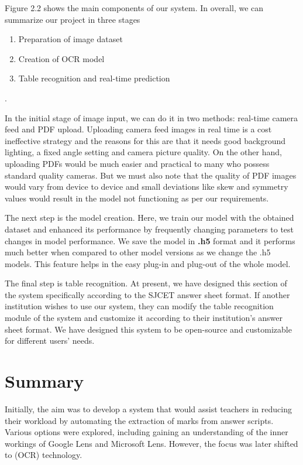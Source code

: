 \noindent
Figure 2.2 shows the main components of our system. In overall, we can summarize our project in three stages \begin{enumerate}
        \item Preparation of image dataset 
        \item Creation of OCR model 
        \item Table recognition and real-time prediction
    \end{enumerate}. 

\vspace{2.5mm}

\noindent
In the initial stage of image input, we can do it in two methods: real-time camera feed and PDF upload. Uploading camera feed images in real time is a cost ineffective strategy and the reasons for this are that it needs good background lighting, a fixed angle setting and camera picture quality. On the other hand, uploading PDFs would be much easier and practical to many who possess standard quality cameras. But we must also note that the quality of PDF images would vary from device to device and small deviations like skew and symmetry values would result in the model not functioning as per our requirements.

\noindent
The next step is the model creation. Here, we train our model with the obtained dataset and enhanced its performance by frequently changing parameters to test changes in model performance. We save the model in \textbf{.h5} format and it performs much better when compared to other model versions as we change the .h5 models. This feature helps in the easy plug-in and plug-out of the whole model.

\clearpage

\noindent
The final step is table recognition. At present, we have designed this section of the system specifically according to the SJCET answer sheet format. If another institution wishes to use our system, they can modify the table recognition module of the system and customize it according to their institution's answer sheet format. We have designed this system to be open-source and customizable for different users' needs.

\section{Summary}

\noindent 
Initially, the aim was to develop a system that would assist teachers in reducing their workload by automating the extraction of marks from answer scripts. Various options were explored, including gaining an understanding of the inner workings of Google Lens and Microsoft Lens. However, the focus was later shifted to (OCR) technology.

